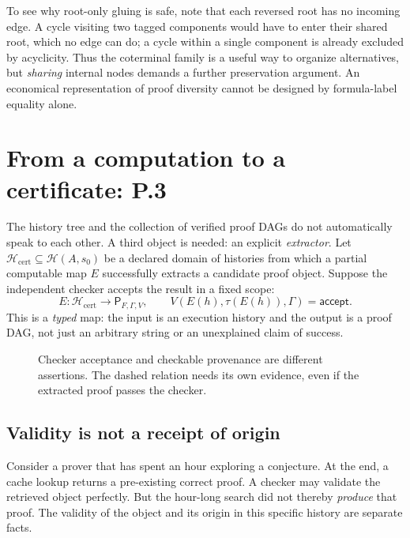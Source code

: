\documentclass[11pt,letterpaper]{article}
\theoremstyle{plaincompact}
\newcommand{\hist}{\mathcal H}
\newcommand{\proofs}{\mathsf P_{F,\Gamma,V}}
\newcommand{\cert}{\hist_{\mathrm{cert}}}
\newcommand{\accept}{\mathsf{accept}}
\begin{document}
To see why root-only gluing is safe, note that each reversed root has no incoming edge. A cycle visiting two tagged components would have to enter their shared root, which no edge can do; a cycle within a single component is already excluded by acyclicity. Thus the coterminal family is a useful way to organize alternatives, but \emph{sharing} internal nodes demands a further preservation argument. An economical representation of proof diversity cannot be designed by formula-label equality alone.

\section{From a computation to a certificate: P.3}
The history tree and the collection of verified proof DAGs do not automatically speak to each other. A third object is needed: an explicit \emph{extractor}. Let $\cert\subseteq\hist(A,s_0)$ be a declared domain of histories from which a partial computable map $E$ successfully extracts a candidate proof object. Suppose the independent checker accepts the result in a fixed scope:
\[
 E:\cert\longrightarrow\proofs,
 \qquad V(E(h),\tau(E(h)),\Gamma)=\accept.
\]
This is a \emph{typed} map: the input is an execution history and the output is a proof DAG, not just an arbitrary string or an unexplained claim of success.

\begin{figure}[htbp]
\centering
{}
\caption{Checker acceptance and checkable provenance are different assertions. The dashed relation needs its own evidence, even if the extracted proof passes the checker.}
\end{figure}

\subsection{Validity is not a receipt of origin}
Consider a prover that has spent an hour exploring a conjecture. At the end, a cache lookup returns a pre-existing correct proof. A checker may validate the retrieved object perfectly. But the hour-long search did not thereby \emph{produce} that proof. The validity of the object and its origin in this specific history are separate facts.
\end{document}
